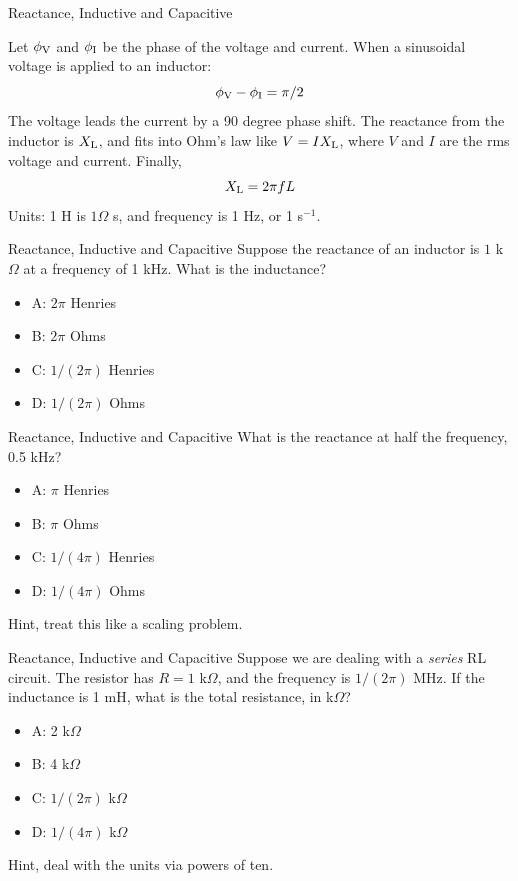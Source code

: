 \documentclass{beamer}
\begin{document}
\begin{frame}{Reactance, Inductive and Capacitive}
\begin{tcolorbox}[colback=white,colframe=black!40!black,title=Reactance and Inductors]
\alert{Let $\phi_{\rm V}$ and $\phi_{\rm I}$ be the phase of the voltage and current.  When a sinusoidal voltage is applied to an inductor:
\begin{equation}
\phi_{\rm V} - \phi_{\rm I} = \pi/2
\end{equation}
The voltage leads the current by a 90 degree phase shift.  The reactance from the inductor is $X_{\rm L}$, and fits into Ohm's law like $V = I X_{\rm L}$, where $V$ and $I$ are the rms voltage and current.  Finally,
\begin{equation}
X_{\rm L} = 2\pi f L
\end{equation}
\footnotesize
Units: 1 H is $1 \Omega$ s, and frequency is 1 Hz, or 1 s$^{-1}$.}
\end{tcolorbox}
\end{frame}

\begin{frame}{Reactance, Inductive and Capacitive}
Suppose the reactance of an inductor is $1$ k$\Omega$ at a frequency of 1 kHz.  What is the inductance?
\begin{itemize}
\item A: $2\pi$ Henries
\item B: $2\pi$ Ohms
\item C: $1/(2\pi)$ Henries
\item D: $1/(2\pi)$ Ohms
\end{itemize}
\end{frame}

\begin{frame}{Reactance, Inductive and Capacitive}
What is the reactance at half the frequency, 0.5 kHz?
\begin{itemize}
\item A: $\pi$ Henries
\item B: $\pi$ Ohms
\item C: $1/(4\pi)$ Henries
\item D: $1/(4\pi)$ Ohms
\end{itemize}
\footnotesize
Hint, treat this like a scaling problem.
\end{frame}

\begin{frame}{Reactance, Inductive and Capacitive}
Suppose we are dealing with a \textit{series} RL circuit.  The resistor has $R = 1$ k$\Omega$, and the frequency is $1/(2\pi)$ MHz.  If the inductance is 1 mH, what is the total resistance, in k$\Omega$?
\begin{itemize}
\item A: 2 k$\Omega$
\item B: 4 k$\Omega$
\item C: $1/(2\pi)$ k$\Omega$
\item D: $1/(4\pi)$ k$\Omega$
\end{itemize}
\footnotesize
Hint, deal with the units via powers of ten.
\end{frame}
\end{document}
